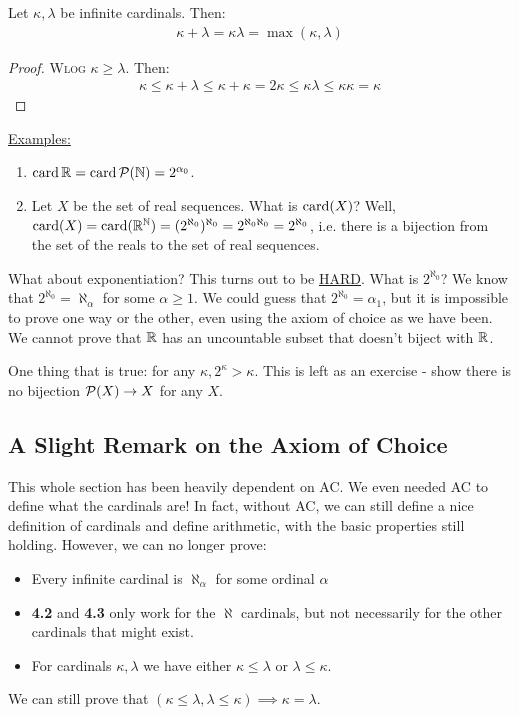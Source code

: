 \documentclass[10pt,a4paper]{article}
\begin{document}
\begin{corollary}
Let $\kappa, \lambda$ be infinite cardinals. Then:
\begin{align*}
\kappa+\lambda = \kappa\lambda = \max(\kappa,\lambda)
\end{align*}
\end{corollary}
\begin{proof}
\textsc{Wlog} $\kappa \geq \lambda$. Then:
\begin{align*}
\kappa \leq \kappa+\lambda \leq \kappa+\kappa = 2\kappa \leq \kappa\lambda\leq \kappa\kappa =\kappa
\end{align*}
\end{proof}
\hspace*{-1em}\underline{Examples:}
\begin{enumerate}
\item $\operatorname{card}{\mathbb{R}} = \operatorname{card}{\mathcal{P}(\mathbb{N})} = 2^{\alpha_0}$.
\item Let $X$ be the set of real sequences. What is $\operatorname{card}(X)$? Well, $\operatorname{card}(X) = \operatorname{card}(\mathbb{R}^{\mathbb{N}}) = (2^{\aleph_0})^{\aleph_0}=2^{\aleph_0\aleph_0}=2^{\aleph_0}$, i.e. there is a bijection from the set of the reals to the set of real sequences.
\end{enumerate}
What about exponentiation? This turns out to be \underline{\underline{HARD}}. What is $2^{\aleph_0}$? We know that $2^{\aleph_0} = \aleph_\alpha$ for some $\alpha \geq 1$. We could guess that $2^{\aleph_0} = \alpha_1$, but it is impossible to prove one way or the other, even using the axiom of choice as we have been. We cannot prove that $\mathbb{R}$ has an uncountable subset that doesn't biject with $\mathbb{R}$.

One thing that is true: for any $\kappa, 2^{\kappa} > \kappa$. This is left as an exercise - show there is no bijection $\mathcal{P}(X) \to X$ for any $X$.

\subsection{A Slight Remark on the Axiom of Choice}
This whole section has been heavily dependent on AC. We even needed AC to define what the cardinals are! In fact, without AC, we can still define a nice definition of cardinals and define arithmetic, with the basic properties still holding. However, we can no longer prove:
\begin{itemize}
\item Every infinite cardinal is $\aleph_\alpha$ for some ordinal $\alpha$
\item \textbf{4.2} and \textbf{4.3} only work for the $\aleph$ cardinals, but not necessarily for the other cardinals that might exist.
\item For cardinals $\kappa, \lambda$ we have either $\kappa \leq \lambda$ or $\lambda \leq \kappa$.
\end{itemize}
We can still prove that $(\kappa\leq\lambda, \lambda\leq\kappa)\implies \kappa=\lambda$.
\end{document}
